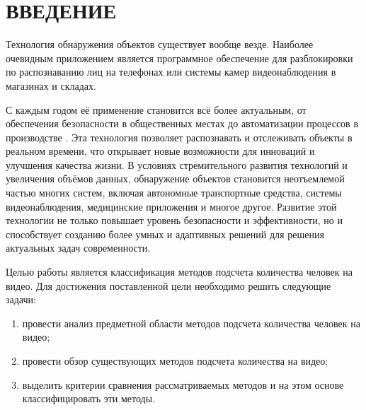 \chapter*{ВВЕДЕНИЕ}

Технология обнаружения объектов существует вообще везде. Наиболее очевидным приложением является программное обеспечение для разблокировки по распознаванию лиц на телефонах или системы камер видеонаблюдения в магазинах и складах.

С каждым годом её применение становится всё более актуальным, от обеспечения безопасности в общественных местах до автоматизации процессов в производстве \cite{intro1}. Эта технология позволяет распознавать и отслеживать объекты в реальном времени, что открывает новые возможности для инноваций и улучшения качества жизни. В условиях стремительного развития технологий и увеличения объёмов данных, обнаружение объектов становится неотъемлемой частью многих систем, включая автономные транспортные средства, системы видеонаблюдения, медицинские приложения и многое другое. Развитие этой технологии не только повышает уровень безопасности и эффективности, но и способствует созданию более умных и адаптивных решений для решения актуальных задач современности.

Целью работы является классификация методов подсчета количества человек на видео.
Для достижения поставленной цели необходимо решить следующие задачи:
\begin{enumerate}[leftmargin=1.6\parindent]
    \item провести анализ предметной области методов подсчета количества человек на видео;
    \item провести обзор существующих методов подсчета количества на видео;
    \item выделить критерии сравнения рассматриваемых методов и на этом основе классифицировать эти методы.
\end{enumerate}